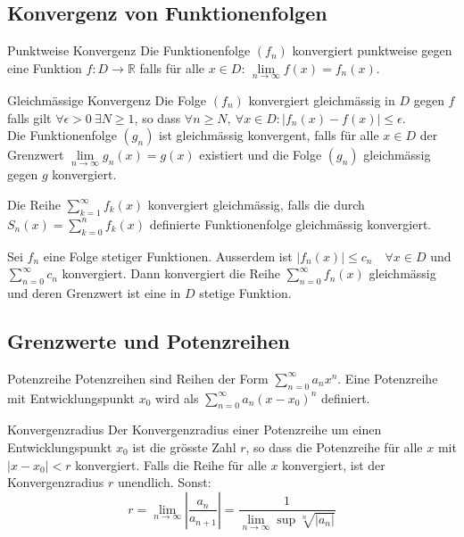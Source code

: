 \documentclass[a4paper,10pt]{article}
\def\limn{\lim\limits_{n\to \infty}}
\def\sumk{\sum\limits_{k=1}^{\infty}}
\def\R{\mathbb{R}}
\begin{document}
\subsection{Konvergenz von Funktionenfolgen}

\begin{mainbox}{Punktweise Konvergenz}
  Die Funktionenfolge $(f_n)$ konvergiert punktweise gegen eine Funktion $f: D \to \R$ falls für alle $x \in D$: $\limn f(x) = f_n(x)$.
\end{mainbox}

\begin{mainbox}{Gleichmässige Konvergenz}
 Die Folge $(f_n)$ konvergiert gleichmässig in $D$ gegen $f$ falls gilt $\forall \epsilon > 0 \ \exists N \ge 1$, so dass $\forall n \ge N, \ \forall x \in D: | f_n(x) - f(x) | \le \epsilon$. \\
 Die Funktionenfolge $(g_n)$ ist gleichmässig konvergent, falls für alle $x\in D$ der Grenzwert $\limn g_n(x) = g(x)$ existiert und die Folge $(g_n)$ gleichmässig gegen $g$ konvergiert.
\end{mainbox}
Die Reihe $\sumk f_k(x)$ konvergiert gleichmässig, falls die durch $S_n(x) = \sum_{k=0}^n f_k(x)$ definierte Funktionenfolge gleichmässig konvergiert.

\begin{subbox}{}
 Sei $f_n$ eine Folge stetiger Funktionen. Ausserdem ist $|f_n(x)| \le c_n \quad \forall x \in D$ und $\sum_{n=0}^\infty c_n$ konvergiert. Dann konvergiert die Reihe $\sum_{n=0}^\infty f_n(x)$ gleichmässig und deren Grenzwert ist eine in $D$ stetige Funktion.
\end{subbox}

\subsection{Grenzwerte und Potenzreihen}

\begin{subbox}{Potenzreihe}
 Potenzreihen sind Reihen der Form $\sum_{n=0}^\infty a_n x^n$. Eine Potenzreihe mit Entwicklungspunkt $x_0$ wird als $\sum_{n=0}^\infty a_n(x-x_0)^n$ definiert.
\end{subbox}

\begin{mainbox}{Konvergenzradius}
 Der Konvergenzradius einer Potenzreihe um einen Entwicklungspunkt $x_0$ ist die grösste Zahl $r$, so dass die Potenzreihe für alle $x$ mit $|x - x_0| < r$ konvergiert. Falls die Reihe für alle $x$ konvergiert, ist der Konvergenzradius $r$ unendlich. Sonst:
 $$r = \limn \left| \frac{a_n}{a_{n+1}} \right| = \frac{1}{\limn\sup \sqrt[n]{|a_n|}} $$
\end{mainbox}
\end{document}
